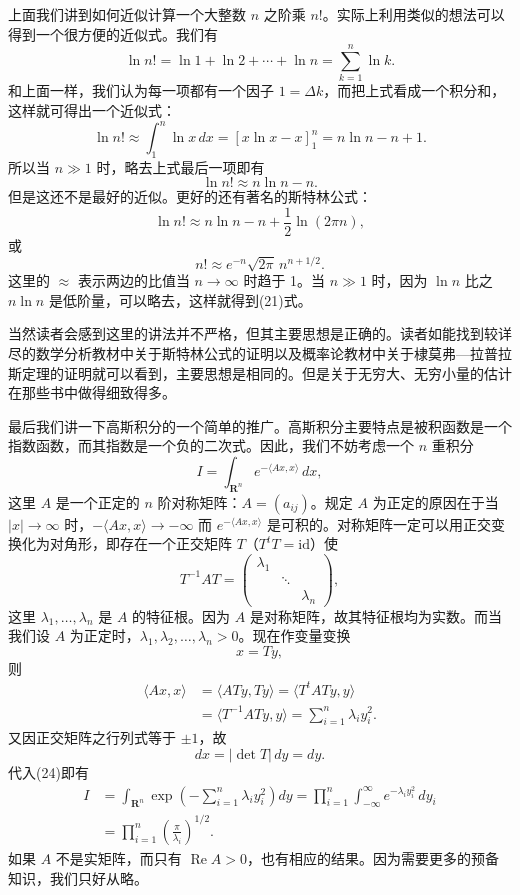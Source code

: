 上面我们讲到如何近似计算一个大整数 $n$ 之阶乘 $n!$。实际上利用类似的想法可以得到一个很方便的近似式。我们有
\[
 \ln n!=\ln1+\ln2+\cdots+\ln n=\sum_{k=1}^n\ln k.
\]
和上面一样，我们认为每一项都有一个因子 $1=\Delta k$，而把上式看成一个积分和，这样就可得出一个近似式：
\[
 \ln n!\approx\int_1^n\ln x\,dx=[x\ln x-x]_1^n=n\ln n-n+1.
\]
所以当 $n\gg1$ 时，略去上式最后一项即有
\begin{equation}
 \ln n!\approx n\ln n-n.
 \tag{21}
\end{equation}
但是这还不是最好的近似。更好的还有著名的斯特林公式：
\begin{equation}
 \ln n!\approx n\ln n-n+\frac12\ln(2\pi n),
 \tag{22}
\end{equation}
或
\begin{equation}
 n!\approx e^{-n}\sqrt{2\pi}\,n^{n+1/2}.
 \tag{23}
\end{equation}
这里的 $\approx$ 表示两边的比值当 $n\to\infty$ 时趋于 1。当 $n\gg1$ 时，因为 $\ln n$ 比之 $n\ln n$ 是低阶量，可以略去，这样就得到(21)式。

当然读者会感到这里的讲法并不严格，但其主要思想是正确的。读者如能找到较详尽的数学分析教材中关于斯特林公式的证明以及概率论教材中关于棣莫弗—拉普拉斯定理的证明就可以看到，主要思想是相同的。但是关于无穷大、无穷小量的估计在那些书中做得细致得多。

最后我们讲一下高斯积分的一个简单的推广。高斯积分主要特点是被积函数是一个指数函数，而其指数是一个负的二次式。因此，我们不妨考虑一个 $n$ 重积分
\begin{equation}
 I=\int_{\mathbf R^n}e^{-\langle Ax,x\rangle}\,dx,
 \tag{24}
\end{equation}
这里 $A$ 是一个正定的 $n$ 阶对称矩阵：$A=(a_{ij})$。规定 $A$ 为正定的原因在于当 $|x|\to\infty$ 时，$-\langle Ax,x\rangle\to-\infty$ 而 $e^{-\langle Ax,x\rangle}$ 是可积的。对称矩阵一定可以用正交变换化为对角形，即存在一个正交矩阵 $T$（$T^tT=\mathrm{id}$）使
\[
 T^{-1}AT=
 \begin{pmatrix}
 \lambda_1&&\\
 &\ddots&\\
 &&\lambda_n
 \end{pmatrix},
\]
这里 $\lambda_1,\ldots,\lambda_n$ 是 $A$ 的特征根。因为 $A$ 是对称矩阵，故其特征根均为实数。而当我们设 $A$ 为正定时，$\lambda_1,\lambda_2,\ldots,\lambda_n>0$。现在作变量变换
\[
 x=Ty,
\]
则
\[
\begin{aligned}
 \langle Ax,x\rangle
 &=\langle ATy,Ty\rangle
 =\langle T^tATy,y\rangle\\
 &=\langle T^{-1}ATy,y\rangle
 =\sum_{i=1}^n\lambda_i y_i^2.
\end{aligned}
\]
又因正交矩阵之行列式等于 $\pm1$，故
\[
 dx=|\det T|\,dy=dy.
\]
代入(24)即有
\begin{equation}
\begin{aligned}
 I
 &=\int_{\mathbf R^n}\exp\!\left(-\sum_{i=1}^n\lambda_i y_i^2\right)dy
 =\prod_{i=1}^n\int_{-\infty}^{\infty}e^{-\lambda_i y_i^2}\,dy_i\\
 &=\prod_{i=1}^n\left(\frac\pi{\lambda_i}\right)^{1/2}.
\end{aligned}
 \tag{25}
\end{equation}
如果 $A$ 不是实矩阵，而只有 $\operatorname{Re}A>0$，也有相应的结果。因为需要更多的预备知识，我们只好从略。
